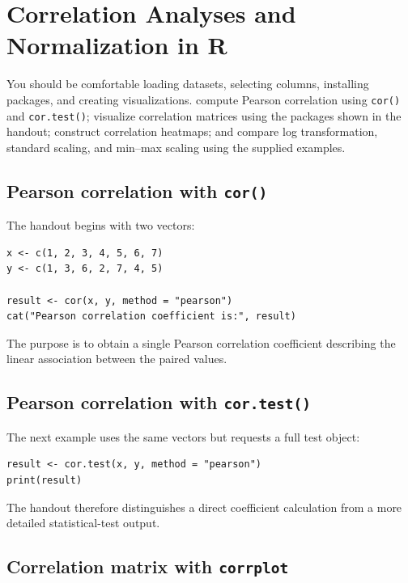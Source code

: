 \chapter{Correlation Analyses and Normalization in R}
\label{chap:correlation-normalization}

\chapterguide
  {You should be comfortable loading datasets, selecting columns, installing packages, and creating visualizations.}
  {compute Pearson correlation using \texttt{cor()} and \texttt{cor.test()}; visualize correlation matrices using the packages shown in the handout; construct correlation heatmaps; and compare log transformation, standard scaling, and min--max scaling using the supplied examples.}

\section{Pearson correlation with \texttt{cor()}}

The handout begins with two vectors:

\begin{lstlisting}[style=dsr]
x <- c(1, 2, 3, 4, 5, 6, 7)
y <- c(1, 3, 6, 2, 7, 4, 5)

result <- cor(x, y, method = "pearson")
cat("Pearson correlation coefficient is:", result)
\end{lstlisting}

The purpose is to obtain a single Pearson correlation coefficient describing the linear association between the paired values.

\section{Pearson correlation with \texttt{cor.test()}}

The next example uses the same vectors but requests a full test object:

\begin{lstlisting}[style=dsr]
result <- cor.test(x, y, method = "pearson")
print(result)
\end{lstlisting}

The handout therefore distinguishes a direct coefficient calculation from a more detailed statistical-test output.

\section{Correlation matrix with \texttt{corrplot}}

